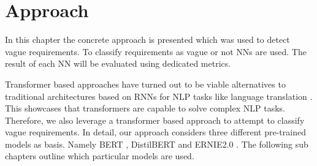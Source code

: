 \chapter{Approach}
\label{chp:approach}


In this chapter the concrete approach is presented which was used to detect vague requirements.
To classify requirements as vague or not \acp{NN} are used.
The result of each \ac{NN} will be evaluated using dedicated metrics.

Transformer based approaches have turned out to be viable alternatives to traditional architectures based on \acp{RNN} for \ac{NLP} tasks like language translation \parencites{Gehring:2017}{Vaswani:2017}.
This showcases that transformers are capable to solve complex \ac{NLP} tasks.
Therefore, we also leverage a transformer based approach to attempt to classify vague requirements.
In detail, our approach considers three different pre-trained models as basis.
Namely \ac{BERT} \parencite{Devlin:2018}, \ac{DistilBERT} \parencite{Sanh:2019} and \ac{ERNIE2.0} \parencite{Sun:2019a}.
The following sub chapters outline which particular models are used.




